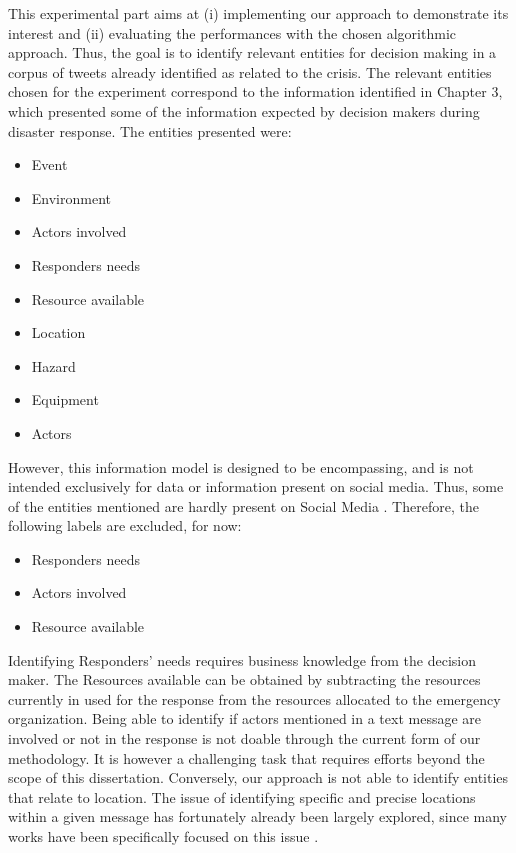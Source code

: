 This experimental part aims at (i) implementing our approach to demonstrate its interest and (ii) evaluating the performances with the chosen algorithmic approach.
Thus, the goal is to identify relevant entities for decision making in a corpus of tweets already identified as related to the crisis.
The relevant entities chosen for the experiment correspond to the information identified in Chapter 3, which presented some of the information expected by decision makers during disaster response.
The entities presented were:

\begin{itemize}
    \item Event
    \item Environment
    \item Actors involved
    \item Responders needs
    \item Resource available
    \item Location
    \item Hazard
    \item Equipment
    \item Actors
\end{itemize}

However, this information model is designed to be encompassing, and is not intended exclusively for data or information present on social media.
Thus, some of the entities mentioned are hardly present on Social Media \parencite{kropczynskiIdentifyingActionableInformation2018}.
Therefore, the following labels are excluded, for now:

\begin{itemize}
    \item Responders needs
    \item Actors involved
    \item Resource available
\end{itemize}

Identifying Responders' needs requires business knowledge from the decision maker.
The Resources available can be obtained by subtracting the resources currently in used for
the response from the resources allocated to the emergency organization.
Being able to identify if actors mentioned in a text message are involved or not in the
response is not doable through the current form of our methodology.
It is however a challenging task that requires efforts beyond the scope of
this dissertation.
Conversely, our approach is not able to identify entities that relate to location.
The issue of identifying specific and precise locations within a given message has fortunately
already been largely explored, since many works have been specifically focused on this issue \parencite{pezanowskiSensePlace3GeovisualFramework2018,maceachrenSenseplace2GeotwitterAnalytics2011}.

